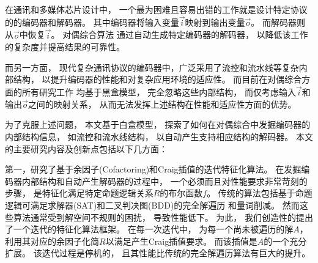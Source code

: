 \begin{cabstract}
在通讯和多媒体芯片设计中，
一个最为困难且容易出错的工作就是设计特定协议的的编码器和解码器。
其中编码器将输入变量$\vec{i}$映射到输出变量$\vec{o}$。
而解码器则从$\vec{o}$中恢复$\vec{i}$。
对偶综合算法
通过自动生成特定编码器的解码器，
以降低该工作的复杂度并提高结果的可靠性。

而另一方面，
现代复杂通讯协议的编码器中，广泛采用了流控和流水线等复杂内部结构，
以提升编码器的性能和对复杂应用环境的适应性。
而目前在对偶综合方面的所有研究工作
均基于黑盒模型，
完全忽略这些内部结构，
而仅考虑输入$\vec{i}$和输出$\vec{o}$之间的映射关系，
从而无法发挥上述结构在性能和适应性方面的优势。

为了克服上述问题，
本文基于白盒模型，
探索了如何在对偶综合中发掘编码器的内部结构信息，
如流控和流水线结构，
以自动产生支持相应结构的解码器。
本文的主要研究内容及创新点包括以下几方面：

第一，研究了基于余因子(Cofactoring)和Craig插值的迭代特征化算法。
在发掘编码器内部结构和自动产生解码器的过程中，
一个必须而且对性能要求非常苛刻的步骤，
是特征化满足特定命题逻辑关系$R$的布尔函数$f$。
传统的算法包括基于命题逻辑可满足求解器(SAT)和二叉判决图(BDD)的完全解遍历
和量词削减。
然而这些算法通常受到解空间不规则的困扰，
导致性能低下。
为此，
我们创造性的提出了一个迭代的特征化算法框架。
在每一次迭代中，
为每一个尚未被遍历的解$A$，
利用其对应的余因子化简$R$以满足产生Craig插值要求。
而该插值是$A$的一个充分扩展。
该迭代过程是停机的，
且其性能比传统的完全解遍历算法有巨大的提升。


\end{cabstract}
